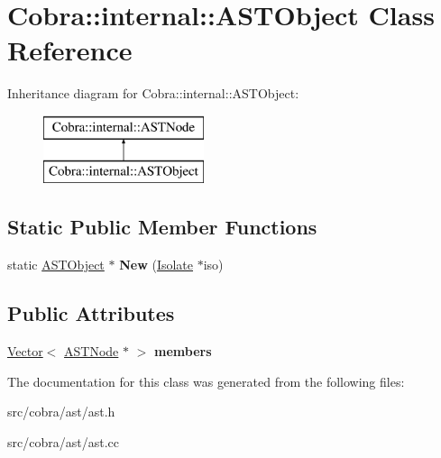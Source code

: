 \hypertarget{class_cobra_1_1internal_1_1_a_s_t_object}{\section{Cobra\+:\+:internal\+:\+:A\+S\+T\+Object Class Reference}
\label{class_cobra_1_1internal_1_1_a_s_t_object}
}
Inheritance diagram for Cobra\+:\+:internal\+:\+:A\+S\+T\+Object\+:\begin{figure}[H]
\begin{center}
\leavevmode
\includegraphics[height=2.000000cm]{class_cobra_1_1internal_1_1_a_s_t_object}
\end{center}
\end{figure}
\subsection*{Static Public Member Functions}
\begin{DoxyCompactItemize}
\item 
\hypertarget{class_cobra_1_1internal_1_1_a_s_t_object_a1f6c4af36fb3a5ee6cab120c7c56da2f}{static \hyperlink{class_cobra_1_1internal_1_1_a_s_t_object}{A\+S\+T\+Object} $\ast$ {\bfseries New} (\hyperlink{class_cobra_1_1internal_1_1_isolate}{Isolate} $\ast$iso)}\label{class_cobra_1_1internal_1_1_a_s_t_object_a1f6c4af36fb3a5ee6cab120c7c56da2f}

\end{DoxyCompactItemize}
\subsection*{Public Attributes}
\begin{DoxyCompactItemize}
\item 
\hypertarget{class_cobra_1_1internal_1_1_a_s_t_object_a2f905d798363fb9a9697ceeb83453cf7}{\hyperlink{class_cobra_1_1internal_1_1_vector}{Vector}$<$ \hyperlink{class_cobra_1_1internal_1_1_a_s_t_node}{A\+S\+T\+Node} $\ast$ $>$ {\bfseries members}}\label{class_cobra_1_1internal_1_1_a_s_t_object_a2f905d798363fb9a9697ceeb83453cf7}

\end{DoxyCompactItemize}


The documentation for this class was generated from the following files\+:\begin{DoxyCompactItemize}
\item 
src/cobra/ast/ast.\+h\item 
src/cobra/ast/ast.\+cc\end{DoxyCompactItemize}

